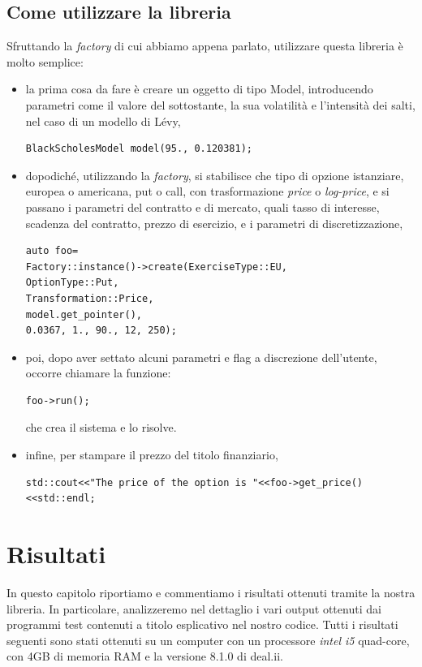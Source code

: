 \documentclass[a4paper,10pt]{report}
\theoremstyle{plain}
\theoremstyle{definition}
\theoremstyle{remark}
\begin{document}
\section{Come utilizzare la libreria}
Sfruttando la \emph{factory} di cui abbiamo appena parlato, utilizzare questa libreria \`e molto semplice:
\begin{itemize}
\item la prima cosa da fare \`e creare un oggetto di tipo \textsf{Model}, introducendo parametri come il valore del sottostante, la sua volatilit\`a e l'intensit\`a dei salti, nel caso di un modello di L\'evy,
\begin{lstlisting}
BlackScholesModel model(95., 0.120381);
\end{lstlisting}
\item dopodich\'e, utilizzando la \emph{factory}, si stabilisce che tipo di opzione istanziare, europea o americana, put o call, con trasformazione \emph{price} o \emph{log-price}, e si passano i parametri del contratto e di mercato, quali tasso di interesse, scadenza del contratto, prezzo di esercizio, e i parametri di discretizzazione,
\begin{lstlisting}
auto foo=
Factory::instance()->create(ExerciseType::EU,
OptionType::Put,
Transformation::Price,
model.get_pointer(),
0.0367, 1., 90., 12, 250);
\end{lstlisting}
\item poi, dopo aver settato alcuni parametri e flag a discrezione dell'utente, occorre chiamare la funzione:
\begin{lstlisting}
foo->run();
\end{lstlisting}
che crea il sistema e lo risolve.
\item infine, per stampare il prezzo del titolo finanziario,
\begin{lstlisting}
std::cout<<"The price of the option is "<<foo->get_price()<<std::endl;
\end{lstlisting}
\end{itemize}
\chapter{Risultati}
In questo capitolo riportiamo e commentiamo i risultati ottenuti tramite la nostra libreria. In particolare, analizzeremo nel dettaglio i vari output ottenuti dai programmi \textsf{test} contenuti a titolo esplicativo nel nostro codice. Tutti i risultati seguenti sono stati ottenuti su un computer con un processore \emph{intel i5} quad-core, con 4GB di memoria RAM e la versione 8.1.0 di \textsf{deal.ii}.
\end{document}
